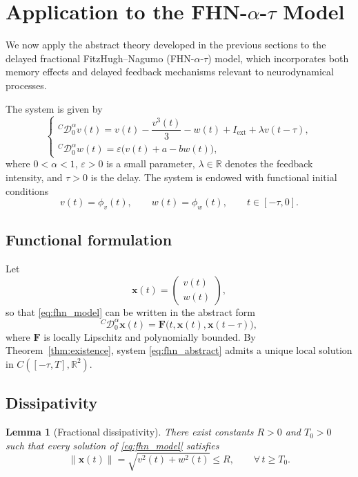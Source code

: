 \documentclass[12pt,a4paper]{article}
\newtheorem{lemma}[theorem]{Lemma}
\numberwithin{equation}{section}
\begin{document}
	\section{Application to the FHN-$\alpha$-$\tau$ Model}
	\label{sec:fhn_model}
	
	We now apply the abstract theory developed in the previous sections to the delayed fractional FitzHugh--Nagumo (FHN-$\alpha$-$\tau$) model, which incorporates both memory effects and delayed feedback mechanisms relevant to neurodynamical processes.
	
	The system is given by
	\begin{equation}
		\begin{cases}
			^{C}\mathcal{D}_{0}^{\alpha} v(t) = v(t) - \dfrac{v^3(t)}{3} - w(t) + I_{\mathrm{ext}} + \lambda v(t-\tau), \\[0.3em]
			^{C}\mathcal{D}_{0}^{\alpha} w(t) = \varepsilon \bigl(v(t) + a - b w(t)\bigr),
		\end{cases}
		\label{eq:fhn_model}
	\end{equation}
	where $0<\alpha<1$, $\varepsilon>0$ is a small parameter, $\lambda\in\mathbb{R}$ denotes the feedback intensity, and $\tau>0$ is the delay. The system is endowed with functional initial conditions
	\begin{equation}
		v(t)=\phi_v(t), \qquad w(t)=\phi_w(t), \qquad t\in[-\tau,0].
		\label{eq:fhn_initial}
	\end{equation}
	
	\subsection*{Functional formulation}
	Let
	\begin{equation}
		\mathbf{x}(t) = \begin{pmatrix} v(t) \\ w(t) \end{pmatrix},
		\label{eq:state_vector}
	\end{equation}
	so that \eqref{eq:fhn_model} can be written in the abstract form
	\begin{equation}
		^{C}\mathcal{D}_{0}^{\alpha}\mathbf{x}(t) = \mathbf{F}\bigl(t,\mathbf{x}(t),\mathbf{x}(t-\tau)\bigr),
		\label{eq:fhn_abstract}
	\end{equation}
	where $\mathbf{F}$ is locally Lipschitz and polynomially bounded. By Theorem~\ref{thm:existence}, system \eqref{eq:fhn_abstract} admits a unique local solution in $C([-\tau,T],\mathbb{R}^2)$.
	
	\subsection*{Dissipativity}
	\begin{lemma}[Fractional dissipativity]
		\label{lem:dissipativity}
		There exist constants $R>0$ and $T_0>0$ such that every solution of \eqref{eq:fhn_model} satisfies
		\begin{equation}
			\|\mathbf{x}(t)\| = \sqrt{v^2(t)+w^2(t)} \le R, \qquad \forall\, t\ge T_0.
			\label{eq:absorbing_ball}
		\end{equation}
	\end{lemma}
	
\end{document}
